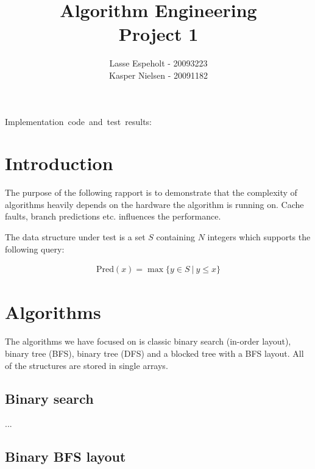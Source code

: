 \documentclass[a4paper]{article}
\begin{document}
\title{Algorithm Engineering\\Project 1}


\author{Lasse Espeholt - 20093223\\
Kasper Nielsen - 20091182}

\maketitle
\vfill{}

\begin{description}
\item [{Implementation~code~and~test~results:}] %
\end{description}
\pagebreak{}\tableofcontents{}\pagebreak{}


\section{Introduction}


The purpose of the following rapport is to demonstrate that the complexity of algorithms heavily depends on the hardware the algorithm is running on. Cache faults, branch predictions etc. influences the performance.

The data structure under test is a set $S$ containing $N$ integers which supports the following query:

\begin{eqnarray*}
\mathrm{Pred}(x) = \max \{ y \in S\ |\ y \leq x \}
\end{eqnarray*}

\section{Algorithms}

The algorithms we have focused on is classic binary search (in-order layout), binary tree (BFS), binary tree (DFS) and a blocked tree with a BFS layout. All of the structures are stored in single arrays.

\subsection{Binary search}

...

\subsection{Binary BFS layout}
\end{document}
